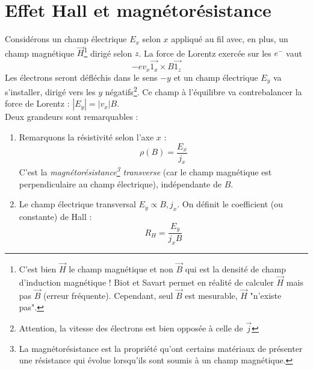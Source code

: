 \section{Effet Hall et magnétorésistance}
Considérons un champ électrique $E_x$ selon $x$ appliqué au fil avec, en plus, un 
champ magnétique $\vec{H}$\footnote{C'est bien $\vec{H}$ le champ magnétique et non 
$\vec B$ qui est la densité de champ d'induction magnétique ! Biot et Savart permet 
en réalité de calculer $\vec{H}$ mais pas $\vec{B}$ (erreur fréquente). Cependant, 
seul $\vec{B}$ est mesurable, $\vec{H}$ "n'existe pas".} dirigé selon $z$. La force 
de Lorentz exercée sur les $e^-$ vaut 
\begin{equation}
-ev_x\vec{1_x}\times B\vec{1_z}
\end{equation}
Les électrons seront défléchis dans le sens $-y$ et un champ électrique $E_y$ va 
s'installer, dirigé vers les $y$ négatifs\footnote{Attention, la vitesse des 
électrons est bien opposée à celle de $\vec{j}$}. Ce champ à l'équilibre va 
contrebalancer la force de Lorentz : $|E_y| = |v_x|B$.\\

Deux grandeurs sont remarquables :
\begin{enumerate}
\item Remarquons la résistivité selon l'axe $x$ :
\begin{equation}
\rho(B) = \dfrac{E_x}{j_x}
\end{equation}
C'est la \textit{magnétorésistance\footnote{La magnétorésistance est la propriété 
qu'ont certains matériaux de présenter une résistance qui évolue lorsqu'ils sont 
soumis à un champ magnétique.} transverse} (car le champ magnétique est 
perpendiculaire au champ électrique), indépendante de $B$.

\item Le champ électrique transversal $E_y \propto B, j_x$. On définit le 
coefficient (ou constante) de Hall :
\begin{equation}
R_H = \dfrac{E_y}{j_xB}
\end{equation}
\end{enumerate}

